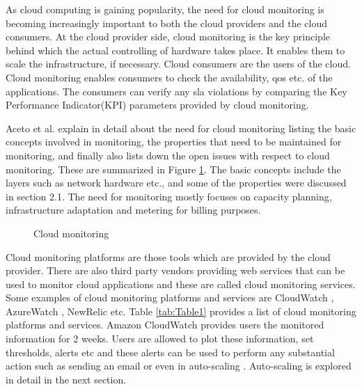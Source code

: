 \documentclass[article,type=msc,colorback,12pt,accentcolor=tud8b,table]{tudthesis}
\begin{document}
 	As cloud computing is gaining popularity, the need for cloud monitoring is becoming increasingly important to  both the cloud providers and the cloud consumers. At the cloud provider side, cloud monitoring is the key principle behind which the actual controlling of hardware takes place. It enables them to scale the infrastructure, if necessary. Cloud consumers are the users of the cloud. Cloud monitoring enables consumers to check the availability, \gls{qos} etc. of the applications. The consumers can verify any \gls{sla} violations by comparing the Key Performance Indicator(KPI) parameters provided by cloud monitoring.
 	
 	Aceto et al. \cite{aceto2013cloud} explain in detail about the need for cloud monitoring listing the basic concepts involved in monitoring, the properties that need to be maintained for monitoring, and finally also lists down the open issues with respect to cloud monitoring. These are summarized in Figure \ref{fig:cloud_monitor}. The basic concepts include the layers such as network hardware etc., and some of the properties were discussed in section 2.1. The need for monitoring mostly focuses on capacity planning, infrastructure adaptation and metering for billing purposes.
 	
 	\begin{figure}
 		\begin{center}
 			\makebox[\textwidth]{\texttt{[image: B5]}}
 		\end{center}
 		\caption{Cloud monitoring \cite{aceto2013cloud}}
 		\label{fig:cloud_monitor}
 	\end{figure}
	
	Cloud monitoring platforms are those tools which are provided by the cloud provider. There are also third party vendors providing web services that can be used to monitor cloud applications and these are called cloud monitoring services. Some examples of cloud monitoring platforms and services are CloudWatch \cite{cloudwatchdev} \cite{cloudwatch}, AzureWatch \cite{azurewatch} , NewRelic \cite{newrelic} etc. Table \ref{tab:Table1} provides a list of cloud monitoring platforms and services. Amazon CloudWatch provides users the monitored information for 2 weeks. Users are allowed to plot these information, set thresholds, alerts etc and these alerts can be used to perform any substantial action such as sending an email or even in auto-scaling \cite{aas}. Auto-scaling is explored in detail in the next section. 
	
\end{document}
